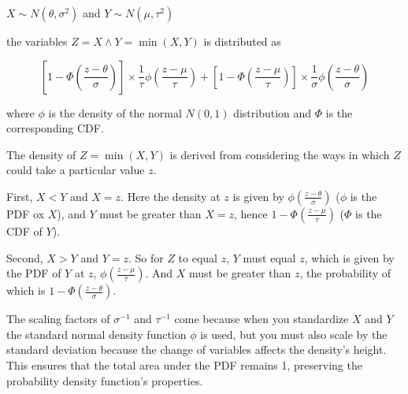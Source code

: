 $X \sim N(\theta, \sigma^2)$ and $Y \sim N(\mu, \tau^2)$

the variables $Z = X \land Y = \min(X, Y)$ is distributed as

$$
\left[ 1 - \Phi\left( \frac{z-\theta}{\sigma} \right) \right] \times \frac{1}{\tau} \phi\left( \frac{z-\mu}{\tau} \right) +
\left[ 1 - \Phi\left( \frac{z-\mu}{\tau} \right) \right] \times \frac{1}{\sigma} \phi\left( \frac{z-\theta}{\sigma} \right)
$$

where $\phi$ is the density of the normal $N(0,1)$ distribution and $\Phi$ is the corresponding CDF.

The density of $Z = \min(X,Y)$ is derived from considering the ways in which $Z$ could take a particular value $z$.

First, $X < Y$ and $X = z$. Here the density at $z$ is given by $\phi\left( \frac{z-\theta}{\sigma} \right)$ ($\phi$ is the PDF ox $X$),
and $Y$ must be greater than $X=z$, hence $1 - \Phi\left( \frac{z-\mu}{\tau} \right)$ ($\Phi$ is the CDF of $Y$).

Second, $X > Y$ and $Y = z$.
So for $Z$ to equal $z$, $Y$ must equal $z$, which is given by the PDF of $Y$ at $z$, $\phi\left( \frac{z-\mu}{\tau} \right)$.
And $X$ must be greater than $z$, the probability of which is $1 - \Phi\left( \frac{z-\theta}{\sigma} \right)$.

The scaling factors of $\sigma^{-1}$ and $\tau^{-1}$ come because when you standardize $X$ and $Y$ 
the standard normal density function $\phi$ is used,
but you must also scale by the standard deviation because the change of variables affects the density's height.
This ensures that the total area under the PDF remains 1, preserving the probability density function's properties.